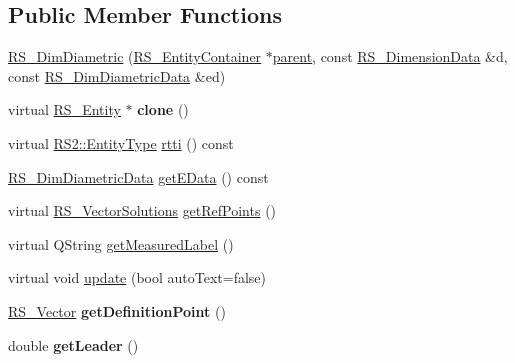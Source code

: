 \subsection*{Public Member Functions}
\begin{DoxyCompactItemize}
\item 
\hyperlink{classRS__DimDiametric_a5c25b8bd38eea3b17ef621f86175ea54}{R\-S\-\_\-\-Dim\-Diametric} (\hyperlink{classRS__EntityContainer}{R\-S\-\_\-\-Entity\-Container} $\ast$\hyperlink{classRS__Entity_a80358a8d2fc6739a516a278dc500b49f}{parent}, const \hyperlink{classRS__DimensionData}{R\-S\-\_\-\-Dimension\-Data} \&d, const \hyperlink{classRS__DimDiametricData}{R\-S\-\_\-\-Dim\-Diametric\-Data} \&ed)
\item 
\hypertarget{classRS__DimDiametric_a4dee22962173f54bcfb27175d85b7ad8}{virtual \hyperlink{classRS__Entity}{R\-S\-\_\-\-Entity} $\ast$ {\bfseries clone} ()}\label{classRS__DimDiametric_a4dee22962173f54bcfb27175d85b7ad8}

\item 
virtual \hyperlink{classRS2_a8f26d1b981e1e85cff16738b43337e6a}{R\-S2\-::\-Entity\-Type} \hyperlink{classRS__DimDiametric_aab24af2d1ddae52bbcb8ef89414d83ca}{rtti} () const 
\item 
\hyperlink{classRS__DimDiametricData}{R\-S\-\_\-\-Dim\-Diametric\-Data} \hyperlink{classRS__DimDiametric_a0a79021aa986da518de3621308a38d7e}{get\-E\-Data} () const 
\item 
virtual \hyperlink{classRS__VectorSolutions}{R\-S\-\_\-\-Vector\-Solutions} \hyperlink{classRS__DimDiametric_acc692ca4d03f6ea61905ee031ef62297}{get\-Ref\-Points} ()
\item 
virtual Q\-String \hyperlink{classRS__DimDiametric_a1a0c0dd082228431da93ebac4d61c7bc}{get\-Measured\-Label} ()
\item 
virtual void \hyperlink{classRS__DimDiametric_a62b10940f133e4c56aa73ab9b5d03a1d}{update} (bool auto\-Text=false)
\item 
\hypertarget{classRS__DimDiametric_a50c44e73c6443f96eb4ead524adcb3c4}{\hyperlink{classRS__Vector}{R\-S\-\_\-\-Vector} {\bfseries get\-Definition\-Point} ()}\label{classRS__DimDiametric_a50c44e73c6443f96eb4ead524adcb3c4}

\item 
\hypertarget{classRS__DimDiametric_ae2d7f827ed71013bed6d4b878f981737}{double {\bfseries get\-Leader} ()}\label{classRS__DimDiametric_ae2d7f827ed71013bed6d4b878f981737}


\end{DoxyCompactItemize}
